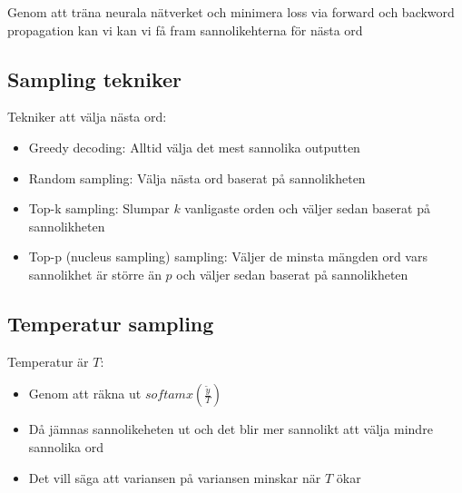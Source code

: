 \documentclass[12pt,a4paper]{article}
\begin{document}
Genom att träna neurala nätverket och minimera loss via forward och backword propagation kan vi kan vi få fram sannolikehterna för nästa ord

\subsection*{Sampling tekniker}
Tekniker att välja nästa ord:
\begin{itemize}
    \item Greedy decoding: Alltid välja det mest sannolika outputten
    \item Random sampling: Välja nästa ord baserat på sannolikheten
    \item Top-k sampling: Slumpar $k$ vanligaste orden och väljer sedan baserat på sannolikheten
    \item Top-p (nucleus sampling) sampling: Väljer de minsta mängden ord vars sannolikhet är större än $p$ och väljer sedan baserat på sannolikheten
\end{itemize}

\subsection*{Temperatur sampling}
Temperatur är $T$:
\begin{itemize}
    \item Genom att räkna ut $softamx(\frac{\tilde{y}}{T})$
    \item Då jämnas sannolikeheten ut och det blir mer sannolikt att välja mindre sannolika ord 
    \item Det vill säga att variansen på variansen minskar när $T$ ökar
\end{itemize}






 




 
 
\end{document}
